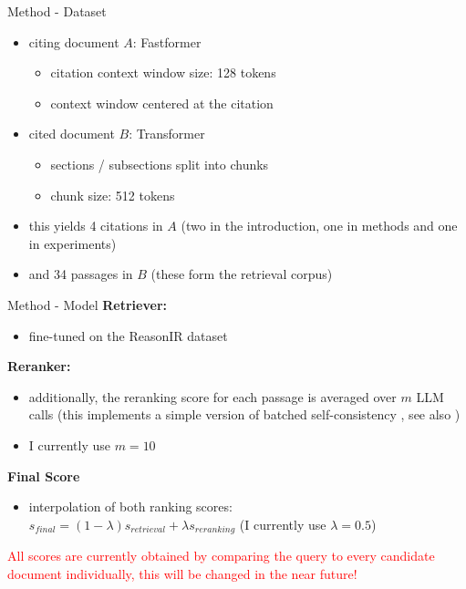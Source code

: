 \begin{frame}{Method - Dataset}
    \begin{itemize}
        \item citing document $A$: Fastformer \cite{wu2021fastformeradditiveattentionneed}
            \begin{itemize}
                \item citation context window size: 128 tokens
                \item context window centered at the citation
            \end{itemize}
        \item cited document $B$: Transformer \cite{vaswani2023attentionneed}
            \begin{itemize}
                \item sections / subsections split into chunks 
                \item chunk size: 512 tokens
            \end{itemize}
        \item this yields 4 citations in $A$ (two in the introduction, one in methods and one in experiments)
        \item and 34 passages in $B$ (these form the retrieval corpus)
    \end{itemize}
\end{frame}

\begin{frame}{Method - Model}
    \textbf{Retriever: } \cite{shao2025reasonirtrainingretrieversreasoning}\\
    \begin{itemize}
        \item {} fine-tuned on the ReasonIR dataset
    \end{itemize}
    \textbf{Reranker: } \cite{qwen2, qwen2.5}\\
    \begin{itemize}
        \item additionally, the reranking score for each passage is averaged over $m$ LLM calls (this implements a simple version of batched self-consistency \cite{korikov2025batchedselfconsistencyimprovesllm}, see also \cite{wang2023selfconsistencyimproveschainthought})
        \item I currently use $m=10$
    \end{itemize}
    \textbf{Final Score}\\
    \begin{itemize}
        \item interpolation of both ranking scores:\\
        $s_{final}=(1-\lambda)s_{retrieval}+\lambda s_{reranking}$ (I currently use $\lambda=0.5$)
    \end{itemize}
    \bigskip
    \textcolor{red}{All scores are currently obtained by comparing the query to every candidate document individually, this will be changed in the near future!}
\end{frame}

